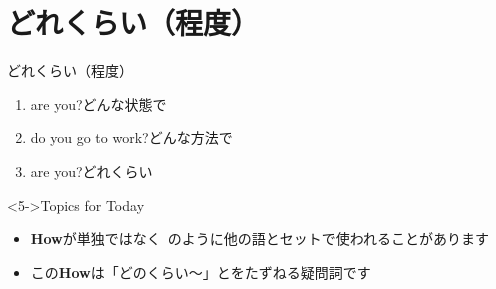 \documentclass[aspectratio=169,xcolor={dvipsnames,table}]{beamer}
\begin{document}
\section{ どれくらい（程度）}
\begin{frame}[plain]{ どれくらい（程度）}
 \begin{enumerate}
  \item<1->  are you?\hfill{\scriptsize どんな状態で}
  \item<2->  do you go to work?\hfill{\scriptsize どんな方法で}
  \item<3->  are you?\hfill{\scriptsize どれくらい}\\
\hfill{}
 \end{enumerate}

\bigskip

\begin{block}<5->{Topics for Today}
 \begin{itemize}[square]\small
  \item {\bfseries How}が単独ではなく\,\,\,のように他の語とセットで使われることがあります
  \item この{\bfseries How}は「どのくらい～」とをたずねる疑問詞です
\end{itemize}
\end{block}
\end{frame}
\end{document}
